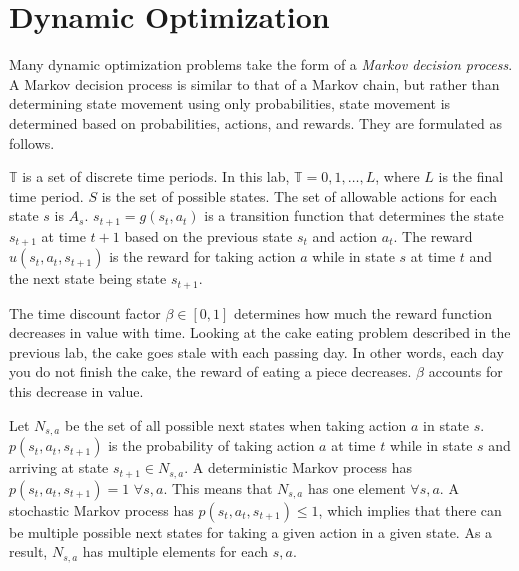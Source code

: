 
\section*{Dynamic Optimization}

Many dynamic optimization problems take the form of a \emph{Markov decision process}.
A Markov decision process is similar to that of a Markov chain, but rather than determining state movement using only probabilities, state movement is determined based on probabilities, actions, and rewards.
They are formulated as follows.

$\mathbb{T}$ is a set of discrete time periods.
In this lab, $\mathbb{T} = {0,1,\ldots, L}$, where $L$ is the final time period.
$S$ is the set of possible states.
The set of allowable actions for each state $s$ is $A_s$.
$s_{t+1}=g(s_t,a_t)$ is a transition function that determines the state $s_{t+1}$ at time $t+1$ based on the previous state $s_t$ and action $a_t$.
The reward $u(s_t,a_t,s_{t+1})$ is the reward for taking action $a$ while in state $s$ at time $t$ and the next state being state $s_{t+1}$.

The time discount factor $\beta \in [0,1]$ determines how much the reward function decreases in value with time.
Looking at the cake eating problem described in the previous lab, the cake goes stale with each passing day.
In other words, each day you do not finish the cake, the reward of eating a piece decreases.
$\beta$ accounts for this decrease in value.

Let $N_{s,a}$ be the set of all possible next states when taking action $a$ in state $s$.
$p(s_t,a_t,s_{t+1})$ is the probability of taking action $a$ at time $t$ while in state $s$ and arriving at state $s_{t+1}\in N_{s,a}$.
A deterministic Markov process has $p(s_t,a_t,s_{t+1}) = 1$ $\forall s,a$.
This means that $N_{s,a}$ has one element $\forall s,a$.
A stochastic Markov process has $p(s_t,a_t,s_{t+1})\leq 1$, which implies that there can be multiple possible next states for taking a given action in a given state.
As a result, $N_{s,a}$ has multiple elements for each $s,a$.

